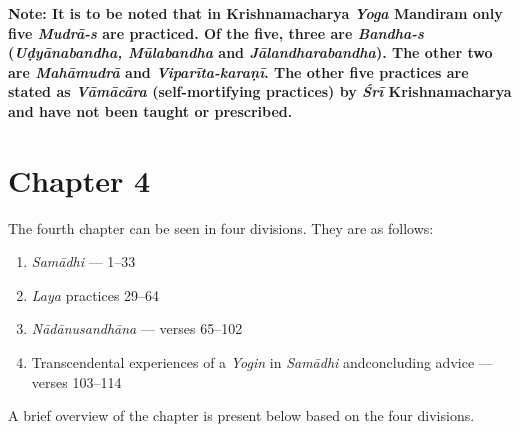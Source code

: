 \textbf{Note: It is to be noted that in Krishnamacharya \textit{Yoga} Mandiram only five \textit{Mudrā-s} are practiced. Of the five, three are \textit{Bandha-s} (\textit{Uḍyānabandha, Mūlabandha} and \textit{Jālandharabandha}). The other two are \textit{Mahāmudrā} and \textit{Viparīta-karaṇī}. The other five practices are stated as \textit{Vāmācāra} (self-mortifying practices) by \textit{Śrī} Krishnamacharya and have not been taught or prescribed.}

\section*{Chapter 4}

The fourth chapter can be seen in four divisions. They are as follows:

\begin{enumerate}
\item \textit{Samādhi} --- 1--33
\item \textit{Laya} practices 29--64
\item \textit{Nādānusandhāna} --- verses 65--102
\item Transcendental experiences of a \textit{Yogin} in \textit{Samādhi} and\break concluding advice ---  verses 103--114
\end{enumerate}

A brief overview of the chapter is present below based on the four divisions.

